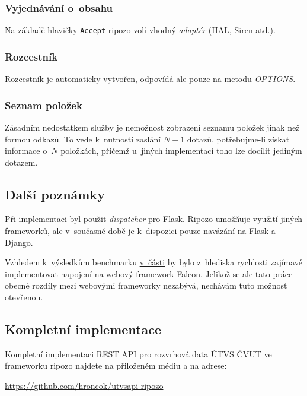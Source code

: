 \subsubsection*{Vyjednávání o~obsahu}\label{vyjednuxe1vuxe1nuxed-o-obsahu}

Na základě hlavičky \verb!Accept! ripozo volí vhodný \emph{adaptér} (HAL, Siren atd.).

\subsubsection*{Rozcestník}\label{rozcestnuxedk}

Rozcestník je automaticky vytvořen, odpovídá ale pouze na metodu \emph{OPTIONS}.

\subsubsection*{Seznam položek}\label{seznam-poloux17eek}

Zásadním nedostatkem služby je nemožnost zobrazení seznamu položek jinak než formou odkazů. To vede k~nutnosti zaslání \(N+1\) dotazů, potřebujme-li získat informace o~\(N\) položkách, přičemž u~jiných implementací toho lze docílit jediným dotazem.

\subsection{Další poznámky}\label{dalux161uxed-poznuxe1mky}

Při implementaci byl použit \emph{dispatcher} pro Flask. Ripozo umožňuje využití jiných frameworků, ale v~současné době je k~dispozici pouze navázání na Flask a Django.

Vzhledem k~výsledkům benchmarku \protect\hyperlink{benchmark}{v~části} by bylo z~hlediska rychlosti zajímavé implementovat napojení na webový framework Falcon. Jelikož se ale tato práce obecně rozdíly mezi webovými frameworky nezabývá, nechávám tuto možnost otevřenou.

\subsection{Kompletní implementace}\label{kompletnuxed-implementace}

Kompletní implementaci REST API pro rozvrhová data ÚTVS ČVUT ve frameworku ripozo najdete na přiloženém médiu a na adrese:

\url{https://github.com/hroncok/utvsapi-ripozo}
